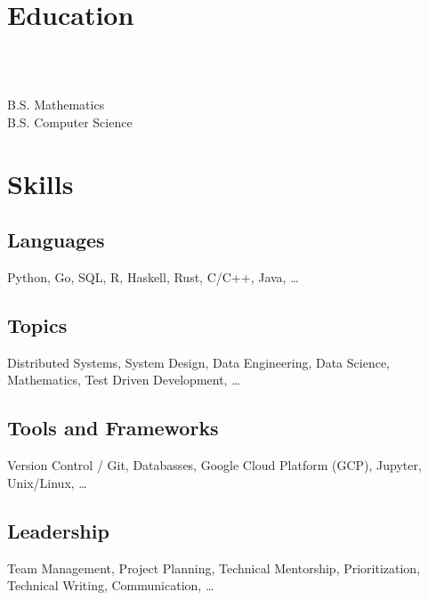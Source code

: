 \documentclass{tc_cv}
\begin{document}

\begin{minipage}[t]{0.3\linewidth}

  \vspace{2em}
  \section{Education}
  \\
  \date{Fall 2011 --- Spring 2016}\vspace{0.25em}\\
  \faGraduationCap \hspace{1ex} B.S. Mathematics\\
  \faGraduationCap \hspace{1ex} B.S. Computer Science

  \vspace{2em}
  \section{Skills}
  \subsection{Languages}
  Python,
  Go,
  SQL,
  R,
  Haskell,
  Rust,
  C/C++,
  Java,
  \ldots

  \subsection{Topics}
  Distributed Systems,
  System Design,
  Data Engineering,
  Data Science,
  Mathematics,
  Test Driven Development,
  \ldots

  \subsection{Tools and Frameworks}
  Version Control / Git,
  Databasses,
  Google Cloud Platform (GCP),
  Jupyter,
  Unix/Linux,
  \ldots

  \subsection{Leadership}
  Team Management,
  Project Planning,
  Technical Mentorship,
  Prioritization,
  Technical Writing,
  Communication,
  \ldots


\end{minipage}
\end{document}
